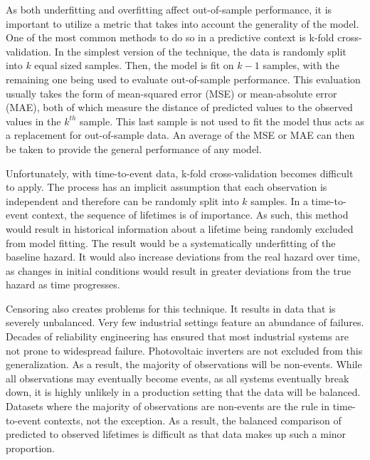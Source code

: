 
As both underfitting and overfitting affect out-of-sample performance, it is important to utilize a metric that takes into account the generality of the model. One of the most common methods to do so in a predictive context is k-fold cross-validation. In the simplest version of the technique, the data is randomly split into $k$ equal sized samples. Then, the model is fit on $k-1$ samples, with the remaining one being used to evaluate out-of-sample performance. This evaluation usually takes the form of mean-squared error (MSE) or mean-absolute error (MAE), both of which measure the distance of predicted values to the observed values in the $k^{th}$ sample. This last sample is not used to fit the model thus acts as a replacement for out-of-sample data. An average of the MSE or MAE can then be taken to provide the general performance of any model. 

Unfortunately, with time-to-event data, k-fold cross-validation becomes difficult to apply. The process has an implicit assumption that each observation is independent and therefore can be randomly split into $k$ samples. In a time-to-event context, the sequence of lifetimes is of importance. As such, this method would result in historical information about a lifetime being randomly excluded from model fitting. The result would be a systematically underfitting of the baseline hazard. It would also increase deviations from the real hazard over time, as changes in initial conditions would result in greater deviations from the true hazard as time progresses.


Censoring also creates problems for this technique. It results in data that is severely unbalanced. Very few industrial settings feature an abundance of failures. Decades of reliability engineering has ensured that most industrial systems are not prone to widespread failure. Photovoltaic inverters are not excluded from this generalization\cite{Petrone2008}. As a result, the majority of observations will be non-events. While all observations may eventually become events, as all systems eventually break down, it is highly unlikely in a production setting that the data will be balanced. Datasets where the majority of observations are non-events are the rule in time-to-event contexts, not the exception. As a result, the balanced comparison of predicted to observed lifetimes is difficult as that data makes up such a minor proportion. 


